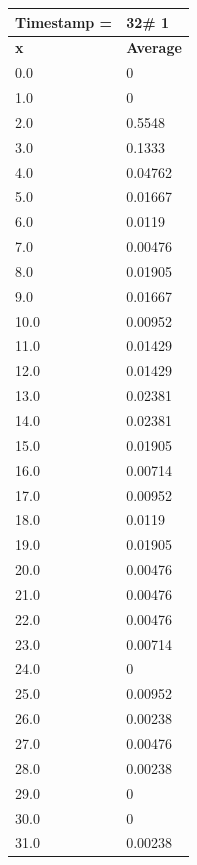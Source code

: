 \begin{tabular}{|l||l|}
\hline
\textbf{Timestamp =} & \textbf{32}\# 1\\\hline
	\textbf{x} & \textbf{Average} \\ \hline
\hline
	0.0 & 0 \\ \hline
	1.0 & 0 \\ \hline
	2.0 & 0.5548 \\ \hline
	3.0 & 0.1333 \\ \hline
	4.0 & 0.04762 \\ \hline
	5.0 & 0.01667 \\ \hline
	6.0 & 0.0119 \\ \hline
	7.0 & 0.00476 \\ \hline
	8.0 & 0.01905 \\ \hline
	9.0 & 0.01667 \\ \hline
	10.0 & 0.00952 \\ \hline
	11.0 & 0.01429 \\ \hline
	12.0 & 0.01429 \\ \hline
	13.0 & 0.02381 \\ \hline
	14.0 & 0.02381 \\ \hline
	15.0 & 0.01905 \\ \hline
	16.0 & 0.00714 \\ \hline
	17.0 & 0.00952 \\ \hline
	18.0 & 0.0119 \\ \hline
	19.0 & 0.01905 \\ \hline
	20.0 & 0.00476 \\ \hline
	21.0 & 0.00476 \\ \hline
	22.0 & 0.00476 \\ \hline
	23.0 & 0.00714 \\ \hline
	24.0 & 0 \\ \hline
	25.0 & 0.00952 \\ \hline
	26.0 & 0.00238 \\ \hline
	27.0 & 0.00476 \\ \hline
	28.0 & 0.00238 \\ \hline
	29.0 & 0 \\ \hline
	30.0 & 0 \\ \hline
	31.0 & 0.00238 \\ \hline
\end{tabular}
